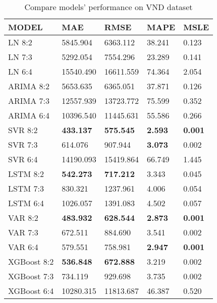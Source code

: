 \documentclass{ieeeojies}
\begin{document}
\begin{table}[H]
\renewcommand{\arraystretch}{1.5}
\centering
\caption{Compare models' performance on VND dataset}
\label{tab5}
\begin{tabular}{lp{1.1cm}p{1.2cm}p{1cm}p{0.9cm}}
\hline
\rowcolor{headercolor}
\textbf{MODEL}  & \textbf{MAE} & \textbf{RMSE} & \textbf{MAPE} & \textbf{MSLE}\\
\hline
\cellcolor{firstcolcolor} LN 8:2 & 5845.904 & 6363.112 & 38.241 & 0.123\\
\cellcolor{firstcolcolor} LN 7:3 & 5292.054 & 7554.296 & 23.289 & 0.141\\
\cellcolor{firstcolcolor} LN 6:4 & 15540.490 & 16611.559 & 74.364 & 2.054\\
\cellcolor{firstcolcolor} ARIMA 8:2 & 5653.635 & 6365.051 & 37.871 & 0.126 \\
\cellcolor{firstcolcolor} ARIMA 7:3 & 12557.939 & 13723.772 & 75.599 & 0.352 \\
\cellcolor{firstcolcolor} ARIMA 6:4 & 10396.540 & 11445.631 & 55.586 & 0.266 \\
\cellcolor{firstcolcolor} SVR 8:2 & \textbf{433.137} & \textbf{575.545} & \textbf{2.593} & \textbf{0.001} \\
\cellcolor{firstcolcolor} SVR 7:3 & 614.076 & 907.944 & \textbf{3.073} & 0.002 \\
\cellcolor{firstcolcolor} SVR 6:4 & 14190.093 & 15419.864 & 66.749 & 1.445 \\
\cellcolor{firstcolcolor} LSTM 8:2 & \textbf{542.273} & \textbf{717.212} & 3.343 & 0.045 \\
\cellcolor{firstcolcolor} LSTM 7:3 & 830.321 & 1237.961 & 4.006 & 0.054 \\
\cellcolor{firstcolcolor} LSTM 6:4 & 1026.057 & 1391.083 & 4.502 & 0.057 \\
\cellcolor{firstcolcolor} VAR 8:2 & \textbf{483.932} & \textbf{628.544} & \textbf{2.873} & \textbf{0.001} \\
\cellcolor{firstcolcolor} VAR 7:3 & 672.511 & 884.690 & 3.541 & 0.002 \\
\cellcolor{firstcolcolor} VAR 6:4 & 579.551 & 758.981 & \textbf{2.947} & \textbf{0.001} \\
\cellcolor{firstcolcolor} XGBoost 8:2 & \textbf{536.848} & \textbf{672.888} & 3.219 & 0.002 \\
\cellcolor{firstcolcolor} XGBoost 7:3 & 734.119 & 929.698 & 3.735 & 0.002 \\
\cellcolor{firstcolcolor} XGBoost 6:4 & 10280.315 & 11813.687 & 46.387 & 0.520 \\

\end{tabular}
\end{table}
\end{document}
